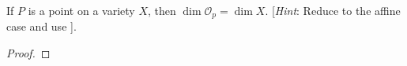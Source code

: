 \label{1.3.12}

If $P$ is a point on a variety $X$, then $\dim \mathcal O_p = \dim X$. [\emph{Hint}: Reduce to the affine case and use \cite[I.3.2c]{hartshorne}].

\begin{proof}

\end{proof}
